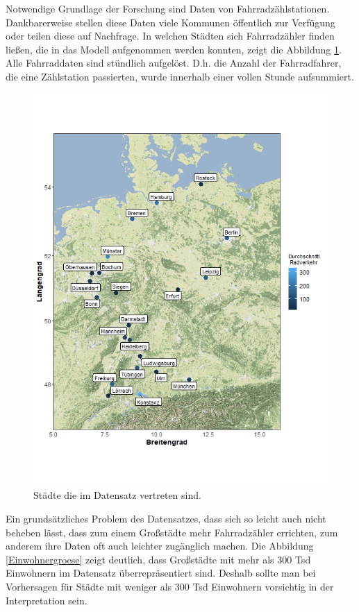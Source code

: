 \documentclass[a4paper,12pt]{thesis}
\begin{document}
Notwendige Grundlage der Forschung sind Daten von Fahrradzählstationen. Dankbarerweise stellen diese Daten viele Kommunen öffentlich zur Verfügung oder teilen diese auf Nachfrage. In welchen Städten sich Fahrradzähler finden ließen, die in das Modell aufgenommen werden konnten, zeigt die Abbildung \ref{Deutschlandkarte}. Alle Fahrraddaten sind stündlich aufgelöst. D.h. die Anzahl der Fahrradfahrer, die eine Zählstation passierten, wurde innerhalb einer vollen Stunde aufsummiert.
\begin{figure}[!ht]
	\centering
	\includegraphics[width=\textwidth]{Plots/plot22.png}
	\caption{Städte die im Datensatz vertreten sind.}
	\label{Deutschlandkarte}
\end{figure}

Ein grundsätzliches Problem des Datensatzes, dass sich so leicht auch nicht beheben lässt, dass zum einem Großstädte mehr Fahrradzähler errichten, zum anderem ihre Daten oft auch leichter zugänglich machen. Die Abbildung \ref{Einwohnergroese} zeigt deutlich, dass Großstädte mit mehr als 300 Tsd Einwohnern im Datensatz überrepräsentiert sind. Deshalb sollte man bei Vorhersagen für Städte mit weniger als 300 Tsd Einwohnern vorsichtig in der Interpretation sein.
\end{document}
